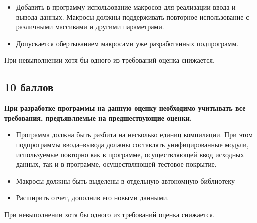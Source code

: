 \documentclass[a4paper, 12pt, oneside]{article}
\begin{document}
\begin{itemize}
    \item Добавить в программу использование макросов для реализации ввода и вывода данных. Макросы должны поддерживать повторное использование с различными массивами и другими параметрами.
    \item Допускается обертыванием макросами уже разработанных подпрограмм.
\end{itemize}
При невыполнении хотя бы одного из требований оценка снижается.

\subsection*{10 баллов}

\textbf{При разработке программы на данную оценку необходимо учитывать все требования, предъявляемые на предшествующие оценки.}

\begin{itemize}
    \item Программа должна быть разбита на несколько единиц компиляции. При этом подпрограммы ввода--вывода должны составлять унифицированные модули, используемые повторно как в программе, осуществляющей ввод исходных данных, так и в программе, осуществляющей тестовое покрытие.
    \item Макросы должны быть выделены в отдельную автономную библиотеку
    \item Расширить отчет, дополнив его новыми данными.
\end{itemize}
При невыполнении хотя бы одного из требований оценка снижается.
\end{document}
